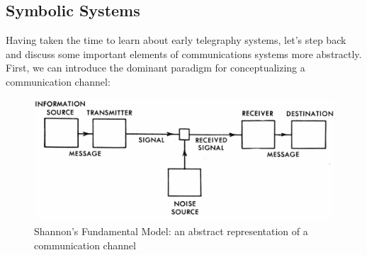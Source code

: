 \documentclass[UTF8]{book}
\begin{document}
\begin{CJK}{UTF8}{gbsn}
\chapter{Symbolic Systems}

Having taken the time to learn about early telegraphy systems, let's step back and discuss some important elements of communications systems more abstractly. First, we can introduce the dominant paradigm for conceptualizing a communication channel:

\begin{figure}[H]
\centering
\includegraphics[width=0.8\linewidth]{shannon_comm_channel}
\caption{Shannon's Fundamental Model: an abstract representation of a communication channel}
\end{figure}


\end{CJK}
\end{document}
